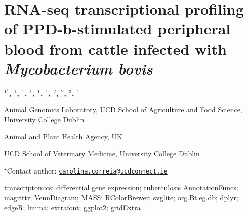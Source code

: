 \documentclass[\main/boa.tex]{subfiles}
\begin{document}
\section{RNA-seq transcriptional profiling of PPD-b-stimulated peripheral blood
from cattle infected with \emph{Mycobacterium bovis}}

\begin{center}
  {\bf {}$^{1^\star}$, $^{1}$, $^{1}$, $^{1}$, $^{1}$, $^{1}$, $^{2}$, $^{2}$, $^{3}$, $^{1}$}
\end{center}

\vskip 0.3cm

\begin{affiliations}
\begin{enumerate}
\begin{minipage}{0.915\textwidth}
\centering
\item Animal Genomics Laboratory, UCD School of Agriculture and Food Science,
University College Dublin \\[-2pt]
\item Animal and Plant Health Agency, UK \\[-2pt]
\item UCD School of Veterinary Medicine, University College Dublin \\[-2pt]
\end{minipage}
\end{enumerate}
$^\star$Contact author: \href{mailto:carolina.correia@ucdconnect.ie}{\nolinkurl{carolina.correia@ucdconnect.ie}}\\
\end{affiliations}

\vskip 0.5cm

\begin{minipage}{0.915\textwidth}
\keywords transcriptomics; differential gene expression; tuberculosis
\packages AnnotationFuncs; magrittr; VennDiagram; MASS; RColorBrewer; svglite;
org.Bt.eg.db; dplyr; edgeR; limma; extrafont; ggplot2; gridExtra
\end{minipage}

\vskip 0.8cm
\end{document}
